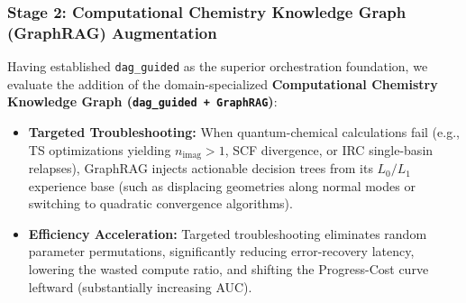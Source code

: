 \documentclass[10pt,twocolumn,letterpaper]{article}
\begin{document}
\subsubsection{Stage 2: Computational Chemistry Knowledge Graph (GraphRAG) Augmentation}
Having established \texttt{dag\_guided} as the superior orchestration foundation, we evaluate the addition of the domain-specialized \textbf{Computational Chemistry Knowledge Graph (\texttt{dag\_guided + GraphRAG})}:
\begin{itemize}[leftmargin=*]
\item \textbf{Targeted Troubleshooting:} When quantum-chemical calculations fail (e.g., TS optimizations yielding $n_\mathrm{imag} > 1$, SCF divergence, or IRC single-basin relapses), GraphRAG injects actionable decision trees from its $L_0/L_1$ experience base (such as displacing geometries along normal modes or switching to quadratic convergence algorithms).
\item \textbf{Efficiency Acceleration:} Targeted troubleshooting eliminates random parameter permutations, significantly reducing error-recovery latency, lowering the wasted compute ratio, and shifting the Progress-Cost curve leftward (substantially increasing AUC).
\end{itemize}
\end{document}
